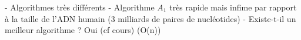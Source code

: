 - Algorithmes très différents
- Algorithme $A_1$ très rapide mais infime par rapport à la taille de l'ADN humain (3 milliards de paires de nucléotides)
- Existe-t-il un meilleur algorithme ? Oui (cf cours) (O(n))